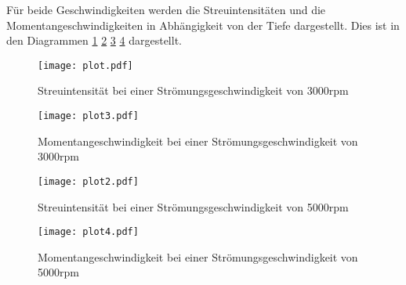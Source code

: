 Für beide Geschwindigkeiten werden die Streuintensitäten und die Momentangeschwindigkeiten in Abhängigkeit von der Tiefe dargestellt. Dies ist in den Diagrammen \ref{fig:plot1}
\ref{fig:plot2} \ref{fig:plot3} \ref{fig:plot4} dargestellt.


\begin{figure}
  \centering
  \texttt{[image: plot.pdf]}
  \caption{Streuintensität bei einer Strömungsgeschwindigkeit von 3000rpm}
  \label{fig:plot1}
\end{figure}

\begin{figure}
  \centering
  \texttt{[image: plot3.pdf]}
  \caption{Momentangeschwindigkeit bei einer Strömungsgeschwindigkeit von 3000rpm}
  \label{fig:plot2}
\end{figure}


\begin{figure}
  \centering
  \texttt{[image: plot2.pdf]}
  \caption{Streuintensität bei einer Strömungsgeschwindigkeit von 5000rpm}
  \label{fig:plot3}
\end{figure}

\begin{figure}
  \centering
  \texttt{[image: plot4.pdf]}
  \caption{Momentangeschwindigkeit bei einer Strömungsgeschwindigkeit von 5000rpm}
  \label{fig:plot4}
\end{figure}
